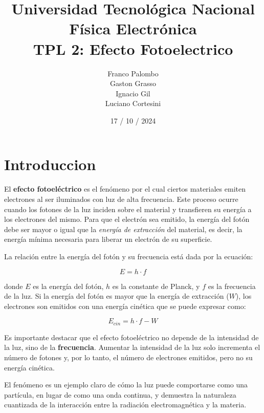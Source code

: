 \documentclass[a4paper,12pt]{report}
\title{%
  \fontsize{25}{0}\selectfont Universidad Tecnológica Nacional \\
  \fontsize{22}{30}\selectfont Física Electrónica \\
  \fontsize{18}{25}\selectfont TPL 2: Efecto Fotoelectrico
}
\author{
Franco Palombo\\
Gaston Grasso\\
Ignacio Gil\\
Luciano Cortesini\\
}
\date{17 / 10 / 2024}
\begin{document}
\maketitle

\chapter{Introduccion}
El \textbf{efecto fotoeléctrico} es el fenómeno por el cual ciertos materiales emiten electrones al ser iluminados con luz de alta frecuencia. Este proceso ocurre cuando los fotones de la luz inciden sobre el material y transfieren su energía a los electrones del mismo. Para que el electrón sea emitido, la energía del fotón debe ser mayor o igual que la \textit{energía de extracción} del material, es decir, la energía mínima necesaria para liberar un electrón de su superficie.


La relación entre la energía del fotón y su frecuencia está dada por la ecuación:

\[
E = h \cdot f
\]

donde \(E\) es la energía del fotón, \(h\) es la constante de Planck, y \(f\) es la frecuencia de la luz. Si la energía del fotón es mayor que la energía de extracción (\(W\)), los electrones son emitidos con una energía cinética que se puede expresar como:

\[
E_{cin} = h \cdot f - W
\]

Es importante destacar que el efecto fotoeléctrico no depende de la intensidad de la luz, sino de la \textbf{frecuencia}. Aumentar la intensidad de la luz solo incrementa el número de fotones y, por lo tanto, el número de electrones emitidos, pero no su energía cinética.

El fenómeno es un ejemplo claro de cómo la luz puede comportarse como una partícula, en lugar de como una onda continua, y demuestra la naturaleza cuantizada de la interacción entre la radiación electromagnética y la materia.
\end{document}
